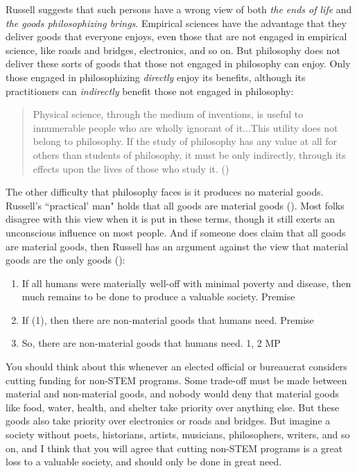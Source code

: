 \documentclass[oneside,letterpaper,12pt]{book}
\begin{document}
Russell suggests that such persons have a wrong view of both \textit{the ends of life} and \textit{the goods philosophizing brings}. Empirical sciences have the advantage that they deliver goods that everyone enjoys, even those that are not engaged in empirical science, like roads and bridges, electronics, and so on. But philosophy does not deliver these sorts of goods that those not engaged in philosophy can enjoy. Only those engaged in philosophizing \textit{directly} enjoy its benefits, although its practitioners can \textit{indirectly} benefit those not engaged in philosophy:
\begin{quote}
	Physical science, through the medium of inventions, is useful to innumerable people who are wholly ignorant of it...This utility does not belong to philosophy. If the study of philosophy has any value at all for others than students of philosophy, it must be only indirectly, through its effects upon the lives of those who study it. (\pageref{indirectly})%
\end{quote}
The other difficulty that philosophy faces is it produces no material goods. Russell's ``practical' man" holds that all goods are material goods (\pageref{materialonly}). Most folks disagree with this view when it is put in these terms, though it still exerts an unconscious influence on most people. And if someone does claim that all goods are material goods, then Russell has an argument against the view that material goods are the only goods (\pageref{waste}):
\begin{enumerate}%
	\item If all humans were materially well-off with minimal poverty and disease, then much remains to be done to produce a valuable society. \hfill Premise
	\item If (1), then there are non-material goods that humans need. \hfill Premise
	\item So, there are non-material goods that humans need. \hfill 1, 2 MP
\end{enumerate}
You should think about this whenever an elected official or bureaucrat considers cutting funding for non-STEM programs. Some trade-off must be made between material and non-material goods, and nobody would deny that material goods like food, water, health, and shelter take priority over anything else. But these goods also take priority over electronics or roads and bridges. But imagine a society without poets, historians, artists, musicians, philosophers, writers, and so on, and I think that you will agree that cutting non-STEM programs is a great loss to a valuable society, and should only be done in great need.
\end{document}
